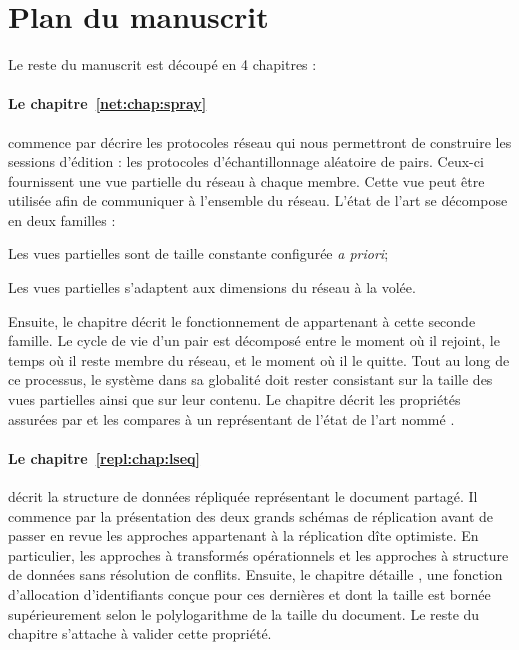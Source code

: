 
\section{Plan du manuscrit}

Le reste du manuscrit est découpé en 4 chapitres :

\paragraph{Le chapitre~\ref{net:chap:spray}} commence par décrire les protocoles
réseau qui nous permettront de construire les sessions d'édition : les
protocoles d'échantillonnage aléatoire de pairs. Ceux-ci fournissent une vue
partielle du réseau à chaque membre. Cette vue peut être utilisée afin de
communiquer à l'ensemble du réseau. L'état de l'art se décompose en deux
familles :
\begin{inparaenum}[(i)]
\item Les vues partielles sont de taille constante configurée \emph{a priori};
\item Les vues partielles s'adaptent aux dimensions du réseau à la volée.
\end{inparaenum}
Ensuite, le chapitre décrit le fonctionnement de \SPRAY appartenant à cette
seconde famille. Le cycle de vie d'un pair est décomposé entre le moment où il
rejoint, le temps où il reste membre du réseau, et le moment où il le
quitte. Tout au long de ce processus, le système dans sa globalité doit rester
consistant sur la taille des vues partielles ainsi que sur leur contenu.  Le
chapitre décrit les propriétés assurées par \SPRAY et les compares à un
représentant de l'état de l'art nommé \CYCLON.

\paragraph{Le chapitre~\ref{repl:chap:lseq}} décrit la structure de données
répliquée représentant le document partagé. Il commence par la présentation des
deux grands schémas de réplication avant de passer en revue les approches
appartenant à la réplication dîte optimiste. En particulier, les approches à
transformés opérationnels et les approches à structure de données sans
résolution de conflits. Ensuite, le chapitre détaille \LSEQ, une fonction
d'allocation d'identifiants conçue pour ces dernières et dont la taille est
bornée supérieurement selon le polylogarithme de la taille du document. Le reste
du chapitre s'attache à valider cette propriété.


